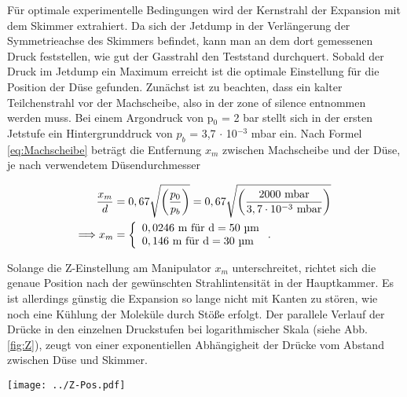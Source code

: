 Für optimale experimentelle Bedingungen wird der Kernstrahl der Expansion mit dem Skimmer extrahiert. Da sich der Jetdump in der Verlängerung der Symmetrieachse des Skimmers befindet, kann man an dem dort gemessenen Druck feststellen, wie gut der Gasstrahl den Teststand durchquert.
Sobald der Druck im Jetdump ein Maximum erreicht ist die optimale Einstellung für die Position der Düse gefunden. Zunächst ist zu beachten, dass ein kalter Teilchenstrahl vor der Machscheibe, also in der zone of silence entnommen werden muss.
Bei einem Argondruck von p$_0$ = 2 bar stellt sich in der ersten Jetstufe ein Hintergrunddruck von $p_b$ = 3,7 $\cdot$ 10$^{-3}$ mbar ein. Nach Formel \ref{eq:Machscheibe} beträgt die Entfernung $x_m$ zwischen Machscheibe und der Düse, je nach verwendetem Düsendurchmesser

\begin{equation}
   \begin{split}
   \frac{x_m}{d} & =0,67 \sqrt{\left(\frac{p_0}{p_b}\right)} = 0,67 \sqrt{\left(\frac{2000 \ \textmd{mbar}}{3,7 \cdot 10^{-3}\ \textmd{mbar}}\right)}\\ 
   \Longrightarrow x_m  & =  
   \left\{ %
   \begin{array}{l}
   0,0246\ \textmd{m} \textmd{ für d}= 50 \textmd{ µm} \\ 
   0,146\ \textmd{m} \textmd{ für d}= 30 \textmd{ µm}
   \end{array}
   \right. .
   \end{split}
\end{equation}

Solange die Z-Einstellung am Manipulator $x_m$ unterschreitet, richtet sich die genaue Position nach der gewünschten Strahlintensität in der Hauptkammer. Es ist allerdings günstig die Expansion so lange nicht mit Kanten zu stören, wie noch eine Kühlung der Moleküle durch Stöße erfolgt. Der parallele Verlauf der Drücke in den einzelnen Druckstufen bei logarithmischer Skala (siehe Abb. \ref{fig:Z}), zeugt von einer exponentiellen Abhängigheit der Drücke vom Abstand zwischen Düse und Skimmer. 

\begin{center}
\begin{minipage}{\linewidth}
\centering
\texttt{[image: ../Z-Pos.pdf]}%
 \label{fig:Z}
\end{minipage} 
\end{center} 

